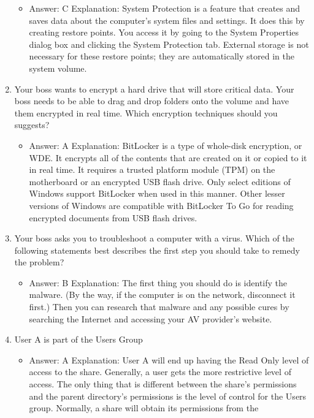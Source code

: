 \documentclass{article}
\begin{document}
\begin{enumerate}
    \begin{itemize}
        \item Answer: C
Explanation: System Protection is a feature that creates and saves data about the computer’s
system files and settings. It does this by creating restore points. You access it
by going to the System Properties dialog box and clicking the System Protection tab.
External storage is not necessary for these restore points; they are automatically stored
in the system volume. 
    \end{itemize}
    \item Your boss wants to encrypt a hard drive that will store critical data. Your boss needs to be able to drag and drop folders onto the volume and have them encrypted in real time. Which encryption techniques should you suggests? 
    \begin{itemize}
        \item Answer: A
Explanation: BitLocker is a type of whole-disk encryption, or WDE. It encrypts all of
the contents that are created on it or copied to it in real time. It requires a trusted
platform module (TPM) on the motherboard or an encrypted USB flash drive. Only
select editions of Windows support BitLocker when used in this manner. Other lesser
versions of Windows are compatible with BitLocker To Go for reading encrypted documents
from USB flash drives.
    \end{itemize}
    \item Your boss asks you to troubleshoot a computer with a virus.
Which of the following statements best describes the first step you
should take to remedy the problem?
    \begin{itemize}
        \item Answer: B
Explanation: The first thing you should do is identify the malware. (By the way, if the
computer is on the network, disconnect it first.) Then you can research that malware
and any possible cures by searching the Internet and accessing your AV provider’s
website.
    \end{itemize}
    \item User A is part of the Users Group
    \begin{itemize}
        \item Answer: A
Explanation: User A will end up having the Read Only level of access to the share.
Generally, a user gets the more restrictive level of access. The only thing that is different
between the share’s permissions and the parent directory’s permissions is the level
of control for the Users group. Normally, a share will obtain its permissions from the

\end{itemize}
\end{enumerate}
\end{document}
